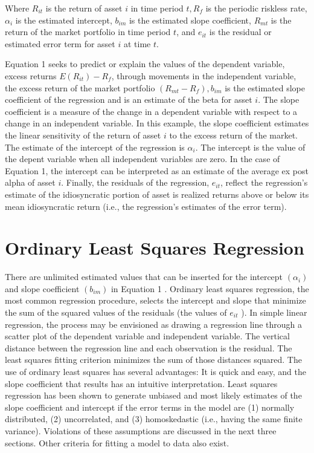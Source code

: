 \documentclass[11pt]{article}
\begin{document}
Where $R_{i t}$ is the return of asset $i$ in time period $t, R_{f}$ is the periodic riskless rate, $\alpha_{i}$ is the estimated intercept, $b_{i m}$ is the estimated slope coefficient, $R_{m t}$ is the return of the market portfolio in time period $t$, and $e_{i t}$ is the residual or estimated error term for asset $i$ at time $t$.

Equation 1 seeks to predict or explain the values of the dependent variable, excess returns $E\left(R_{i t}\right)-R_{f}$, through movements in the independent variable, the excess return of the market portfolio $\left(R_{m t}-R_{f}\right), b_{i m}$ is the estimated slope coefficient of the regression and is an estimate of the beta for asset $i$. The slope coefficient is a measure of the change in a dependent variable with respect to a change in an independent variable. In this example, the slope coefficient estimates the linear sensitivity of the return of asset $i$ to the excess return of the market. The estimate of the intercept of the regression is $\alpha_{i}$. The intercept is the value of the depent variable when all independent variables are zero. In the case of Equation 1, the intercept can be interpreted as an estimate of the average ex post alpha of asset $i$. Finally, the residuals of the regression, $e_{i t}$, reflect the regression's estimate of the idiosyncratic portion of asset is realized returns above or below its mean idiosyncratic return (i.e., the regression's estimates of the error term).

\section*{Ordinary Least Squares Regression}
There are unlimited estimated values that can be inserted for the intercept $\left(\alpha_{i}\right)$ and slope coefficient $\left(b_{i m}\right)$ in Equation 1 . Ordinary least squares regression, the most common regression procedure, selects the intercept and slope that minimize the sum of the squared values of the residuals (the values of $e_{i t}$ ). In simple linear regression, the process may be envisioned as drawing a regression line through a scatter plot of the dependent variable and independent variable. The vertical distance between the regression line and each observation is the residual. The least squares fitting criterion minimizes the sum of those distances squared. The use of ordinary least squares has several advantages: It is quick and easy, and the slope coefficient that results has an intuitive interpretation. Least squares regression has been shown to generate unbiased and most likely estimates of the slope coefficient and intercept if the error terms in the model are (1) normally distributed, (2) uncorrelated, and (3) homoskedastic (i.e., having the same finite variance). Violations of these assumptions are discussed in the next three sections. Other criteria for fitting a model to data also exist.
\end{document}
